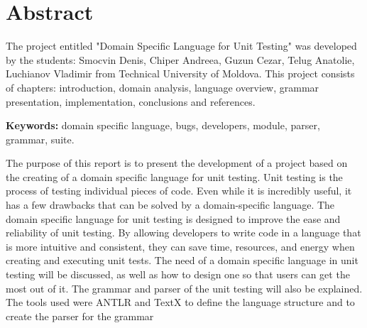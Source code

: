 \chapter*{Abstract}

The project entitled "Domain Specific Language for Unit Testing" was developed by the students: Smocvin Denis, Chiper Andreea, Guzun Cezar, Telug Anatolie, Luchianov Vladimir from Technical University of Moldova. This project consists of  chapters: introduction, domain analysis, language overview, grammar presentation, implementation, conclusions and references.

\textbf{Keywords: }  domain specific language, bugs, developers, module, parser, grammar, suite.

The purpose of this report is to present the development of a project based on the creating of a domain specific language for unit testing. 
Unit testing is the process of testing individual pieces of code. Even while it is incredibly useful, it has a few drawbacks that can be solved by a domain-specific language. 
The domain specific language for unit testing is designed to improve the ease and reliability of unit testing. By allowing developers to write code in a language that is more intuitive and consistent, they can save time, resources, and energy when creating and executing unit tests. 
The need of a domain specific language in unit testing will be discussed, as well as how to design one so that users can get the most out of it. The grammar and parser of the unit testing will also be explained.
The tools used were ANTLR and TextX to define the language structure and  to create the parser for the grammar
